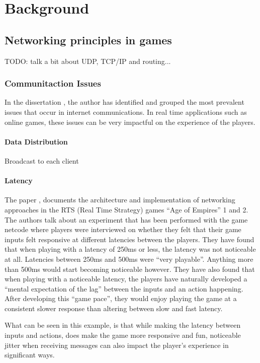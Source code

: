 \chapter{Background}

\section{Networking principles in games}
TODO: talk a bit about UDP, TCP/IP and routing...

\subsection{Communitaction Issues}
In the dissertation , the author has identified and grouped the most prevalent issues that occur in internet communications. In real time applications such as online games, these issues can be very impactful on the experience of the players.

\subsubsection{Data Distribution}
Broadcast to each client

\subsubsection{Latency}
The paper , documents the architecture and implementation of networking approaches in the RTS (Real Time Strategy) games ``Age of Empires'' 1 and 2. The authors talk about an experiment that has been performed with the game netcode where players were interviewed on whether they felt that their game inputs felt responsive at different latencies between the players. They have found that when playing with a latency of 250ms or less, the latency was not noticeable at all. Latencies between 250ms and 500ms were ``very playable''. Anything more than 500ms would start becoming noticeable however. They have also found that when playing with a noticeable latency, the players have naturally developed a ``mental expectation of the lag'' between the inputs and an action happening. After developing this ``game pace'', they would enjoy playing the game at a consistent slower response than altering between slow and fast latency.

What can be seen in this example, is that while making the latency between inputs and actions, does make the game more responsive and fun, noticeable jitter when receiving messages can also impact the player's experience in significant ways.


